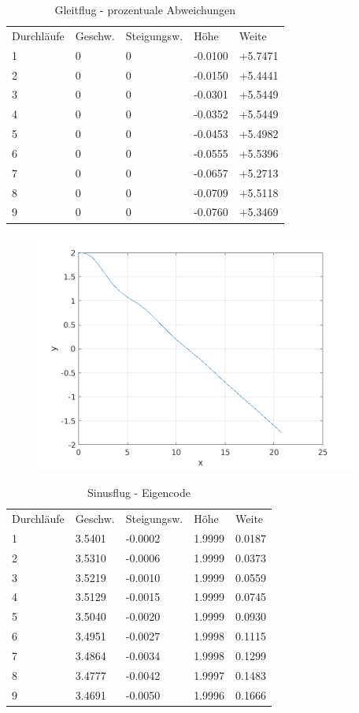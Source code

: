 \documentclass[a4paper,12pt]{scrartcl}
\begin{document}
\begin{table}
\centering
\caption{Gleitflug - prozentuale Abweichungen}
\begin{tabular}{lllll}
Durchläufe & Geschw. & Steigungsw. & Höhe   & Weite   \\
1          & 0  & 0     & -0.0100 & +5.7471  \\
2          & 0  & 0     & -0.0150 & +5.4441  \\
3          & 0  & 0     & -0.0301 & +5.5449  \\
4          & 0  & 0     & -0.0352 & +5.5449  \\
5          & 0  & 0     & -0.0453 & +5.4982  \\
6          & 0  & 0     & -0.0555 & +5.5396  \\
7          & 0  & 0     & -0.0657 & +5.2713  \\
8          & 0  & 0     & -0.0709 & +5.5118  \\
9          & 0  & 0     & -0.0760 & +5.3469 
\end{tabular}
\end{table}
\begin{figure}[htp]
	\centering
	\includegraphics[width=300pt]{flightpath2.png}
	\label{fig:sin}
\end{figure}
\begin{table}
\centering
\caption{Sinusflug - Eigencode}
\begin{tabular}{lllll}
Durchläufe & Geschw. & Steigungsw. & Höhe   & Weite   \\
1          & 3.5401  & -0.0002     & 1.9999 & 0.0187  \\
2          & 3.5310  & -0.0006     & 1.9999 & 0.0373  \\
3          & 3.5219  & -0.0010     & 1.9999 & 0.0559  \\
4          & 3.5129  & -0.0015     & 1.9999 & 0.0745  \\
5          & 3.5040  & -0.0020     & 1.9999 & 0.0930  \\
6          & 3.4951  & -0.0027     & 1.9998 & 0.1115  \\
7          & 3.4864  & -0.0034     & 1.9998 & 0.1299  \\
8          & 3.4777  & -0.0042     & 1.9997 & 0.1483  \\
9          & 3.4691  & -0.0050     & 1.9996 & 0.1666 
\end{tabular}
\end{table}
\end{document}
